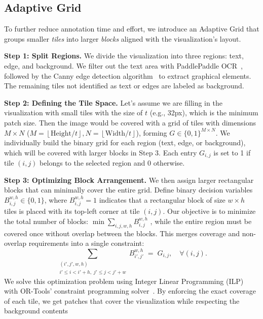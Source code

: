 \subsection{Adaptive Grid} \label{grids:adaptive}
To further reduce annotation time and effort, we introduce an Adaptive Grid that groups smaller \textit{tiles} into larger \textit{blocks} aligned with the visualization’s layout.

\noindent\textbf{Step 1: Split Regions.}
We divide the visualization into three regions: text, edge, and background. We filter out the text area with PaddlePaddle OCR~\cite{paddlepaddle}, followed by the Canny edge detection algorithm~\cite{canny} to extract graphical elements. The remaining tiles not identified as text or edges are labeled as background.

\noindent\textbf{Step 2: Defining the Tile Space.}
Let's assume we are filling in the visualization with small tiles with the size of $t$ (e.g., 32px), which is the minimum patch size. 
Then the image would be covered with a grid of tiles with dimensions $M \times N$ ($M=\left\lfloor \text{Height} / t \right\rfloor, N=\left\lfloor \text{Width} / t \right\rfloor$), forming $G \in \{0,1\}^{M \times N}$. 
We individually build the binary grid for each region (text, edge, or background), which will be covered with larger blocks in Step 3. 
Each entry $G_{i,j}$ is set to 1 if tile $(i,j)$ belongs to the selected region and 0 otherwise. 

\noindent\textbf{Step 3: Optimizing Block Arrangement.}
We then assign larger rectangular blocks that can minimally cover the entire grid. Define binary decision variables $B_{i,j}^{w,h} \in \{0,1\}$, where $B_{i,j}^{w,h} = 1$ indicates that a rectangular block of size $w \times h$ tiles is placed with its top-left corner at tile $(i,j)$. Our objective is to minimize the total number of blocks:
$\min \sum_{i,j,w,h} B_{i,j}^{w,h}$
, while the entire region must be covered once without overlap between the blocks. This merges coverage and non-overlap requirements into a single constraint:
\[
\sum_{\substack{(i',j',w,h) \\ i' \leq i < i'+h,\; j' \leq j < j'+w}} B_{i',j'}^{w,h} \;=\; G_{i,j}, 
\quad \forall (i,j).
\]
We solve this optimization problem using Integer Linear Programming (ILP) with OR-Tools’ constraint programming solver~\cite{ortools}. By enforcing the exact coverage of each tile, we get patches that cover the visualization while respecting the background contents